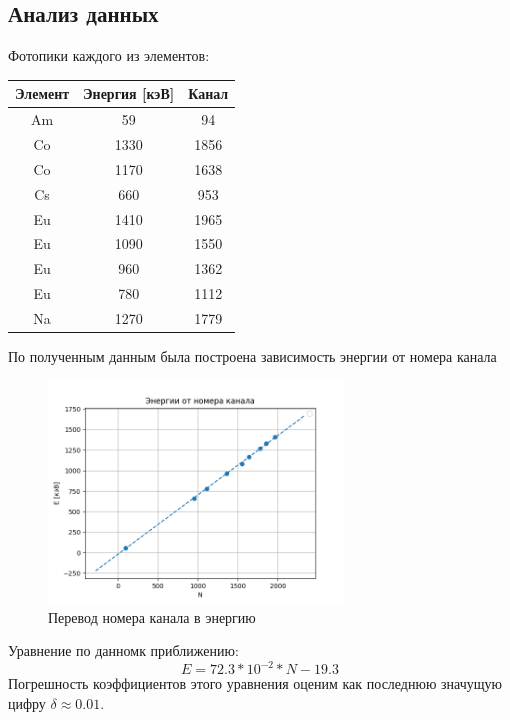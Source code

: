 \documentclass[a4paper,12pt]{article} %
\begin{document}
		\subsection*{Анализ данных}
		Фотопики каждого из элементов:
		\begin{table}[h]
			\centering
			\begin{tabular}{|c|c|c|}
			\hline
			Элемент & Энергия [кэВ]		  & Канал \\ \hline
			Am      & 59                & 94    \\ \hline
			Co      & 1330              & 1856  \\ \hline
			Co      & 1170              & 1638  \\ \hline
			Cs      & 660               & 953   \\ \hline
			Eu      & 1410              & 1965  \\ \hline
			Eu      & 1090              & 1550  \\ \hline
			Eu      & 960               & 1362  \\ \hline
			Eu      & 780               & 1112  \\ \hline
			Na      & 1270              & 1779  \\ \hline
			\end{tabular}
		\end{table}\par
		По полученным данным была построена зависимость энергии от номера канала
		\begin{figure}[h!]
      \includegraphics[width=0.7\textwidth]{img/Chan-approx.png}
      \centering
      \caption{Перевод номера канала в энергию}
    \end{figure}\par
		Уравнение по данномк приближению:
		\begin{equation}
			E = 72.3 * 10^{-2} * N - 19.3
		\end{equation}
		Погрешность коэффициентов этого уравнения оценим как последнюю значущую цифру $\delta \approx 0.01$.\par
	\newpage
\end{document}
